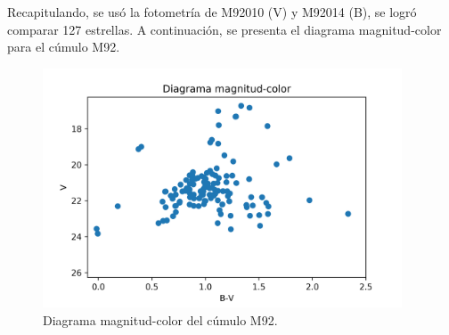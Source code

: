 \documentclass[12pt]{article}
\begin{document}
Recapitulando, se usó la fotometría de M92010 (V) y M92014 (B), se logró comparar 127 estrellas. A continuación, se presenta el diagrama magnitud-color para el cúmulo M92.                                                                                                                                                                                                                                                                                                                                                                                                                                                                                                                                                                                                                                                                                                                                                                                                                                                                                                                                                                                                                                                                                                                                                                                                                                                                                                                                                                                                                                                                                                                                                                                                                                                                                                                                                                                                                                                                                                                                                                                                                                                                           




\begin{figure}[H]
  \centering
   \includegraphics[width= 4.20in]{VvsBV.png}
	\caption{Diagrama magnitud-color del cúmulo M92.}
  \label{diag}
\end{figure}
\end{document}

